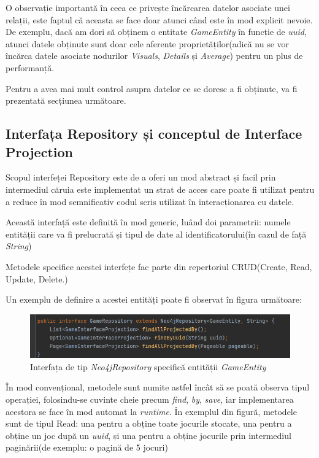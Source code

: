 \documentclass[12pt,a4paper]{report}
\begin{document}
O observație importantă în ceea ce privește încărcarea datelor asociate unei relații, este faptul că aceasta se face doar atunci când este în mod explicit nevoie. De exemplu, dacă am dori să obținem o entitate \emph{GameEntity} în funcție de \emph{uuid}, atunci datele obținute sunt doar cele aferente proprietăților(adică nu se vor încărca datele asociate nodurilor \emph{Visuals}, \emph{Details} și \emph{Average}) pentru un plus de performanță.

Pentru a avea mai mult control asupra datelor ce se doresc a fi obținute, va fi prezentată secțiunea următoare.

\subsection{Interfața Repository și conceptul de Interface Projection}

Scopul interfeței Repository este de a oferi un mod abstract și facil prin intermediul căruia este implementat un strat de acces care poate fi utilizat pentru a reduce în mod semnificativ codul scris utilizat în interacționarea cu datele. \cite{22}

Această interfață este definită în mod generic, luând doi parametrii: numele entității care va fi prelucrată și tipul de date al identificatorului(în cazul de față \emph{String})

Metodele specifice acestei interfețe fac parte din repertoriul CRUD(Create, Read, Update, Delete.)

Un exemplu de definire a acestei entități poate fi observat în figura următoare:

\begin{figure}[H]
\centering
\caption{}
\includegraphics[scale = 0.8]{exemplu_19_repository}
\caption*{Interfața de tip \emph{Neo4jRepository} specifică entității \emph{GameEntity}}
\end{figure}

În mod convențional, metodele sunt numite astfel încât să se poată observa tipul operației, folosindu-se cuvinte cheie precum \emph{find}, \emph{by}, \emph{save}, iar implementarea acestora se face în mod automat la \emph{runtime}. În exemplul din figură, metodele sunt de tipul Read: una pentru a obține toate jocurile stocate, una pentru a obține un joc după un \emph{uuid}, și una pentru a obține jocurile prin intermediul paginării(de exemplu: o pagină de 5 jocuri)
\end{document}
